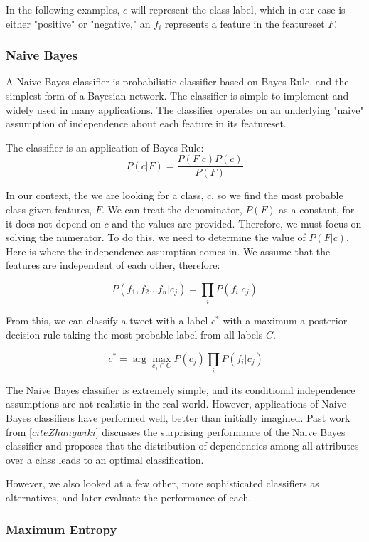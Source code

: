 \documentclass[preprint,pre,floats,aps,amsmath,amssymb,12pt]{revtex4}
\begin{document}
In the following examples, $c$ will represent the class label, which in our case is either "positive" or "negative," an $f_{i}$ represents a feature in the featureset $F$. 


\subsubsection{Naive Bayes}
A Naive Bayes classifier is probabilistic classifier based on Bayes Rule, and the simplest form of a Bayesian network. The classifier is simple to implement and widely used in many applications. The classifier operates on an underlying "naive" assumption of independence about each feature in its featureset.

The classifier is an application of Bayes Rule:
\[ P(c|F) = \frac{P(F|c) P(c)}{P(F)} \]

In our context, the we are looking for a class, $c$, so we find the most probable class given features, $F$. We can treat the denominator, $P(F)$ as a constant, for it does not depend on $c$ and the values are provided. Therefore, we must focus on solving the numerator. To do this, we need to determine the value of $P(F|c)$. Here is where the independence assumption comes in. We assume that the features are independent of each other, therefore:

\[ P(f_{1}, f_{2} \ldots f_{n}|c_{j}) = \prod_{i} P(f_{i} | c_{j}) \]

From this, we can classify a tweet with a label $c^{*}$ with a maximum a posterior decision rule taking the most probable label from all labels $C$. 

\[\ c^{*} = \arg\max_{c_{j} \in C} P(c_{j})
\prod_{i} P(f_{i} | c_{j}) \]	

The Naive Bayes classifier is extremely simple, and its conditional independence assumptions are not realistic in the real world. However, applications of Naive Bayes classifiers have performed well, better than initially imagined. Past work from [$cite Zhang wiki$] discusses the surprising performance of the Naive Bayes classifier and proposes that the distribution of dependencies among all attributes over a class leads to an optimal classification. 

However, we also looked at a few other, more sophisticated classifiers as alternatives, and later evaluate the performance of each. 

\subsubsection{Maximum Entropy}
\end{document}
